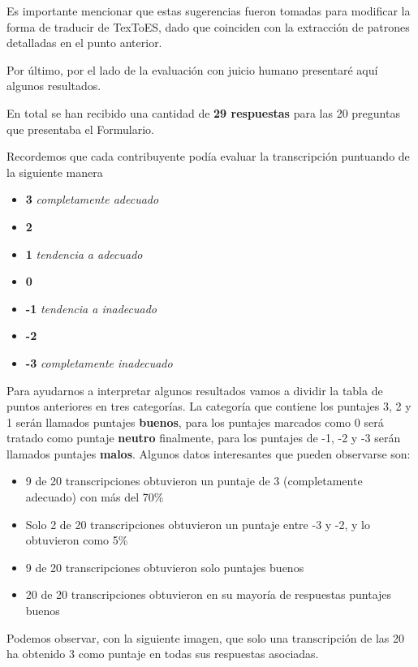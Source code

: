 Es importante mencionar que estas sugerencias fueron tomadas para modificar la forma de traducir de TexToES, dado que coinciden con la extracción de patrones detalladas en el punto anterior.

Por último, por el lado de la evaluación con juicio humano presentaré aquí algunos resultados.

En total se han recibido una cantidad de \textbf{29 respuestas} para las 20 preguntas que presentaba el Formulario.

Recordemos que cada contribuyente podía evaluar la transcripción puntuando de la siguiente manera

\begin{itemize}
   \item \textbf{3} \textit{completamente adecuado}
   \item \textbf{2}
   \item \textbf{1} \textit{tendencia a adecuado}
   \item \textbf{0}
   \item \textbf{-1} \textit{tendencia a inadecuado}
   \item \textbf{-2}
   \item \textbf{-3} \textit{completamente inadecuado}
\end{itemize}

Para ayudarnos a interpretar algunos resultados vamos a dividir la tabla de puntos anteriores en tres categorías. La categoría que contiene los puntajes 3, 2 y 1 serán llamados puntajes \textbf{buenos}, para los puntajes marcados como 0 será tratado como puntaje \textbf{neutro} finalmente, para los puntajes de -1, -2 y -3 serán llamados puntajes \textbf{malos}.
Algunos datos interesantes que pueden observarse son:

\begin{itemize}
   \item 9 de 20 transcripciones obtuvieron un puntaje de 3 (completamente adecuado) con más del 70\%
   \item Solo 2 de 20 transcripciones obtuvieron un puntaje entre -3 y -2, y lo obtuvieron como 5\%
   \item 9 de 20 transcripciones obtuvieron solo puntajes buenos
   \item 20 de 20 transcripciones obtuvieron en su mayoría de respuestas puntajes buenos
\end{itemize}

Podemos observar, con la siguiente imagen, que solo una transcripción de las 20 ha obtenido 3 como puntaje en todas sus respuestas asociadas.

